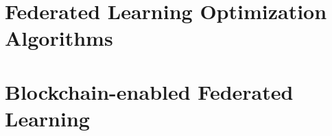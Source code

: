\section{Federated Learning Optimization Algorithms}

\section{Blockchain-enabled Federated Learning}


% 



% 







